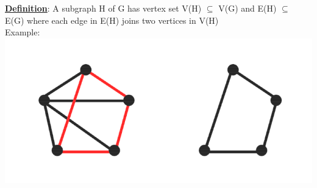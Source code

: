 \documentclass[12pt]{article}
\newcommand{\myt}[1]{\textbf{\underline{#1}}}
\begin{document}
	\myt{Definition}: A subgraph H of G has vertex set V(H) $\subseteq$ V(G) and E(H) $\subseteq$ E(G) where each edge in E(H) joins two vertices in V(H)\\
	
	Example:\\
	\includegraphics[scale=0.5]{subgraph.png}
	
	
	
	
\end{document}
